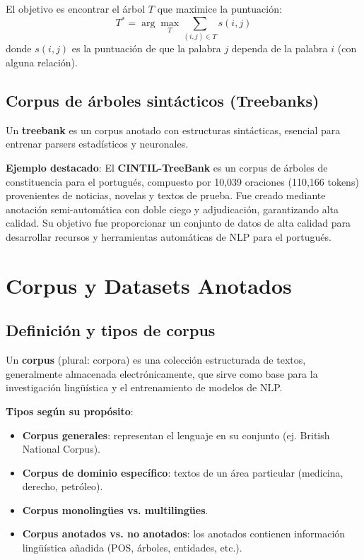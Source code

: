 \documentclass[12pt,a4paper,openany,oneside]{book}
\begin{document}
El objetivo es encontrar el árbol \(T\) que maximice la puntuación:
\[
T^* = \arg\max_{T} \sum_{(i,j) \in T} s(i,j)
\]
donde \(s(i,j)\) es la puntuación de que la palabra \(j\) dependa de la palabra \(i\) (con alguna relación).

\subsection{Corpus de árboles sintácticos (Treebanks)}
Un \textbf{treebank} es un corpus anotado con estructuras sintácticas, esencial para entrenar parsers estadísticos y neuronales.

\textbf{Ejemplo destacado}: El \textbf{CINTIL-TreeBank} es un corpus de árboles de constituencia para el portugués, compuesto por 10,039 oraciones (110,166 tokens) provenientes de noticias, novelas y textos de prueba. Fue creado mediante anotación semi-automática con doble ciego y adjudicación, garantizando alta calidad. Su objetivo fue proporcionar un conjunto de datos de alta calidad para desarrollar recursos y herramientas automáticas de NLP para el portugués.

\section{Corpus y Datasets Anotados}

\subsection{Definición y tipos de corpus}
Un \textbf{corpus} (plural: corpora) es una colección estructurada de textos, generalmente almacenada electrónicamente, que sirve como base para la investigación lingüística y el entrenamiento de modelos de NLP.

\textbf{Tipos según su propósito}:
\begin{itemize}
    \item \textbf{Corpus generales}: representan el lenguaje en su conjunto (ej. British National Corpus).
    \item \textbf{Corpus de dominio específico}: textos de un área particular (medicina, derecho, petróleo).
    \item \textbf{Corpus monolingües vs. multilingües}.
    \item \textbf{Corpus anotados vs. no anotados}: los anotados contienen información lingüística añadida (POS, árboles, entidades, etc.).
\end{itemize}
\end{document}
